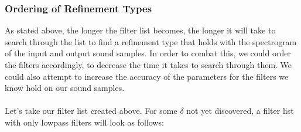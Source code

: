 \subsubsection{Ordering of Refinement Types}

As stated above, the longer the filter list becomes, the longer it will take to search through the list to find a refinement type that holds with the spectrogram of the input and output sound samples. In order to combat this, we could order the filters accordingly, to decrease the time it takes to search through them. We could also attempt to increase the accuracy of the parameters for the filters we know hold on our sound samples. \\ \\
Let's take our filter list created above. For some $\delta$ not yet discovered, a filter list with only lowpass filters will look as follows:

